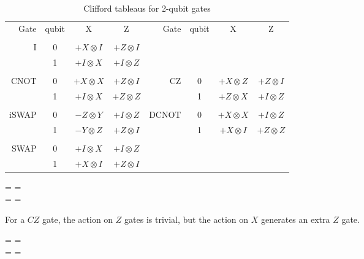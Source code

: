 \begin{table*}[tp]
\caption{Clifford tableaus for 2-qubit gates}
\label{Fig:CliffordTableaus}
\begin{center}
\begin{tabular}{rcccrccc}
Gate & qubit & X & Z & \hspace{2em} Gate & qubit & X & Z \\
\\
I & 0 & $+ X \otimes I$ & $+ Z \otimes I$ \\
	 & 1 & $+ I \otimes X$ & $+ I \otimes Z$ \\
\\
CNOT & 0 & $+ X \otimes X$ & $+ Z \otimes I$ & CZ   & 0 & $+ X \otimes Z$ & $+ Z \otimes I$ \\
	 & 1 & $+ I \otimes X$ & $+ Z \otimes Z$ &      & 1 & $+ Z \otimes X$ & $+ I \otimes Z$\\
\\
iSWAP & 0 & $- Z \otimes Y$ & $+ I \otimes Z$ & DCNOT & 0 & $+ X \otimes X$ & $+ I \otimes Z$  \\
      & 1 & $- Y \otimes Z$ & $+ Z \otimes I$ &       & 1 & $+ X \otimes I$ & $+ Z \otimes Z$  \\
\\
SWAP & 0 & $+ I \otimes X$ & $+ I \otimes Z$ \\
	 & 1 & $+ X \otimes I$ & $+ Z \otimes I$ \\
\end{tabular}
\end{center}
\end{table*}


\begin{center}
 =  
\hspace{2em}
  =   
\\
 =   
\hspace{2em}
 = 
\end{center}


For a $CZ$ gate, the action on $Z$ gates is trivial, but the action on $X$ generates an extra $Z$ gate.
\begin{center}
 =  
\hspace{2em}
  =   
\\
 =   
\hspace{2em}
 = 
\end{center}

